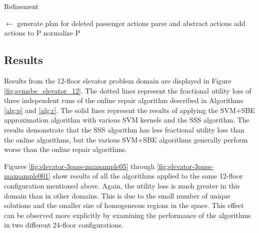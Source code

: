 \begin{algorithm}
\caption{Refinement}
\label{alg:r}

\begin{algorithmic}[1] 
   $\leftarrow$ generate plan for deleted passenger actions
  \State parse and abstract {actions}
  \State add {actions} to P
  \State normalize P
\end{algorithmic}
\end{algorithm}




\subsection{Results}

Results from the 12-floor elevator problem domain are displayed in Figure \ref{fig:svmsbe_elevator_12}.  The dotted lines represent the fractional utility loss of three independent runs of the online repair algorithm described in Algorithms \ref{alg:p} and \ref{alg:r}.  The solid lines represent the results of applying the SVM+SBE approximation algorithm with various SVM kernels and the SSS algorithm.  The results demonstrate that the SSS algorithm has less fractional utility loss than the online algorithms, but the various SVM+SBE algorithms generally perform worse than the online repair algorithms.


Figures \ref{fig:elevator-3pass-maxsample05} through \ref{fig:elevator-3pass-maxsample001} show results of all the algorithms applied to the same 12-floor configuration mentioned above.  Again, the utility loss is much greater in this domain than in other domains.  This is due to the small number of unique solutions and the smaller size of homogeneous regions in the space.  This effect can be observed more explicitly by examining the performance of the algorithms in two different 24-floor configurations.  


